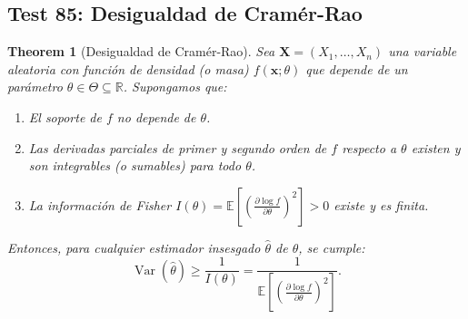\documentclass[11pt,a4paper]{article}
\theoremstyle{plain}
\newtheorem{theorem}{Theorem}[section]
\theoremstyle{definition}
\begin{document}
\subsection{Test 85: Desigualdad de Cramér-Rao}

\begin{theorem}[Desigualdad de Cramér-Rao]
Sea $\mathbf{X} = (X_1, \ldots, X_n)$ una variable aleatoria con función de densidad (o masa) $f(\mathbf{x}; \theta)$ que depende de un parámetro $\theta \in \Theta \subseteq \mathbb{R}$. Supongamos que:
\begin{enumerate}
    \item El soporte de $f$ no depende de $\theta$.
    \item Las derivadas parciales de primer y segundo orden de $f$ respecto a $\theta$ existen y son integrables (o sumables) para todo $\theta$.
    \item La información de Fisher $I(\theta) = \mathbb{E}\left[\left(\frac{\partial \log f}{\partial \theta}\right)^2\right] > 0$ existe y es finita.
\end{enumerate}
Entonces, para cualquier estimador insesgado $\hat{\theta}$ de $\theta$, se cumple:
\[
\operatorname{Var}(\hat{\theta}) \geq \frac{1}{I(\theta)} = \frac{1}{\mathbb{E}\left[\left(\frac{\partial \log f}{\partial \theta}\right)^2\right]}.
\]
\end{theorem}
\end{document}
